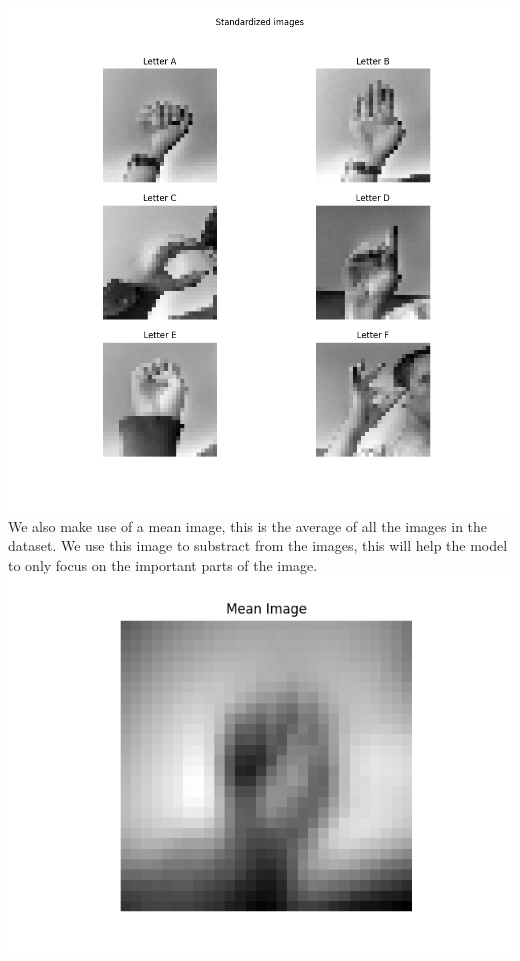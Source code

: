 \documentclass[../paper.tex]{subfiles}
\begin{document}
    \includegraphics[width=\linewidth]{letters_grid_standardized_6}
    We also make use of a mean image, this is the average of all the images in the dataset.
    We use this image to substract from the images, this will help the model to only focus on the important parts of the image.
    \includegraphics[width=\linewidth]{mean_image_6} 
\end{document}
